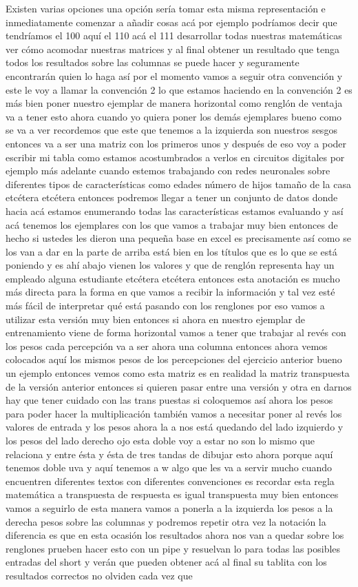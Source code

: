  Existen varias opciones una opción sería tomar esta misma representación e inmediatamente comenzar a añadir cosas acá por ejemplo podríamos decir que tendríamos el 100 aquí el 110 acá el 111 desarrollar todas nuestras matemáticas ver cómo acomodar nuestras matrices y al final obtener un resultado que tenga todos los resultados sobre las columnas se puede hacer y seguramente encontrarán quien lo haga así por el momento vamos a seguir otra convención y este le voy a llamar la convención 2 lo que estamos haciendo en la convención 2 es más bien poner nuestro ejemplar de manera horizontal como renglón de ventaja va a tener esto ahora cuando yo quiera poner los demás ejemplares bueno como se va a ver recordemos que este que tenemos a la izquierda son nuestros sesgos entonces va a ser una matriz con los primeros unos y después de eso voy a poder escribir mi tabla como estamos acostumbrados a verlos en circuitos digitales por ejemplo más adelante cuando estemos trabajando con redes neuronales sobre diferentes tipos de características como edades número de hijos tamaño de la casa etcétera etcétera entonces podremos llegar a tener un conjunto de datos donde hacia acá estamos enumerando todas las características estamos evaluando y así acá tenemos los ejemplares con los que vamos a trabajar muy bien entonces de hecho si ustedes les dieron una pequeña base en excel es precisamente así como se los van a dar en la parte de arriba está bien en los títulos que es lo que se está poniendo y es ahí abajo vienen los valores y que de renglón representa hay un empleado alguna estudiante etcétera etcétera entonces esta anotación es mucho más directa para la forma en que vamos a recibir la información y tal vez esté más fácil de interpretar qué está pasando con los renglones por eso vamos a utilizar esta versión muy bien entonces si ahora en nuestro ejemplar de entrenamiento viene de forma horizontal vamos a tener que trabajar al revés con los pesos cada percepción va a ser ahora una columna entonces ahora vemos colocados aquí los mismos pesos de los percepciones del ejercicio anterior bueno un ejemplo entonces vemos como esta matriz es en realidad la matriz transpuesta de la versión anterior entonces si quieren pasar entre una versión y otra en darnos hay que tener cuidado con las trans puestas si coloquemos así ahora los pesos para poder hacer la multiplicación también vamos a necesitar poner al revés los valores de entrada y los pesos ahora la a nos está quedando del lado izquierdo y los pesos del lado derecho ojo esta doble voy a estar no son lo mismo que relaciona y entre ésta y ésta de tres tandas de dibujar esto ahora porque aquí tenemos doble uva y aquí tenemos a w algo que les va a servir mucho cuando encuentren diferentes textos con diferentes convenciones es recordar esta regla matemática a transpuesta de respuesta es igual transpuesta muy bien entonces vamos a seguirlo de esta manera vamos a ponerla a la izquierda los pesos a la derecha pesos sobre las columnas y podremos repetir otra vez la notación la diferencia es que en esta ocasión los resultados ahora nos van a quedar sobre los renglones prueben hacer esto con un pipe y resuelvan lo para todas las posibles entradas del short y verán que pueden obtener acá al final su tablita con los resultados correctos no olviden cada vez que 